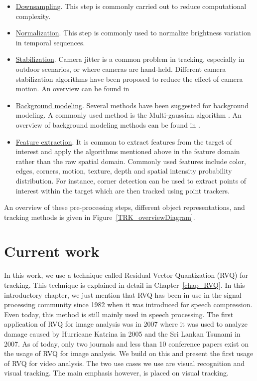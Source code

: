 \begin{itemize}
\item \underline{Downsampling}.  This step is commonly carried out to reduce computational complexity.
\item \underline{Normalization}.  This step is commonly used to normalize brightness variation in temporal sequences.
\item \underline{Stabilization}.  Camera jitter is a common problem in tracking, especially in outdoor scenarios, or where cameras are hand-held.  Different camera stabilization algorithms have been proposed to reduce the effect of camera motion.  An overview can be found in \cite{2006_WHITE_stab_Sachs, 1999_JNL_stab_Engelsberg}
\item \underline{Background modeling}.  Several methods have been suggested for background modeling.  A commonly used method is the Multi-gaussian algorithm \cite{1999_CNF_RealTimeTracking_Stauffer}.  An overview of background modeling methods can be found in \cite{1999_CNF_Wallflower_Toyama}.
\item \underline{Feature extraction}.  It is common to extract features from the target of interest and apply the algorithms mentioned above in the feature domain rather than the raw spatial domain.  Commonly used features include color, edges, corners, motion, texture, depth and spatial intensity probability distribution.  For instance, corner detection \cite{1988_CNF_CombinedCornerEdgeDetector_Harris,2004_JNL_SIFT_Mikolajczyk} can be used to extract points of interest within the target which are then tracked using point trackers. 
\end{itemize}

An overview of these pre-processing steps, different object representations, and tracking methods is given in Figure~\ref{TRK_overviewDiagram}.

\section{Current work}
In this work, we use a technique called Residual Vector Quantization (RVQ) for tracking.  This technique is explained in detail in Chapter~\ref{chap_RVQ}.  In this introductory chapter, we just mention that RVQ has been in use in the signal processing community since 1982 \cite{1982_CNF_SpeechRVQ_JuangGray} when it was introduced for speech compression.  Even today, this method is still mainly used in speech processing.  The first application of RVQ for image analysis was in 2007 \cite{2007_JNL_IDDM_Barnes} where it was used to analyze damage caused by Hurricane Katrina in 2005 and the Sri Lankan Tsunami in 2007.  As of today, only two journals and less than 10 conference papers exist on the usage of RVQ for image analysis.  We build on this and present the first usage of RVQ for video analysis.  The two use cases we use are visual recognition and visual tracking.  The main emphasis however, is placed on visual tracking.

